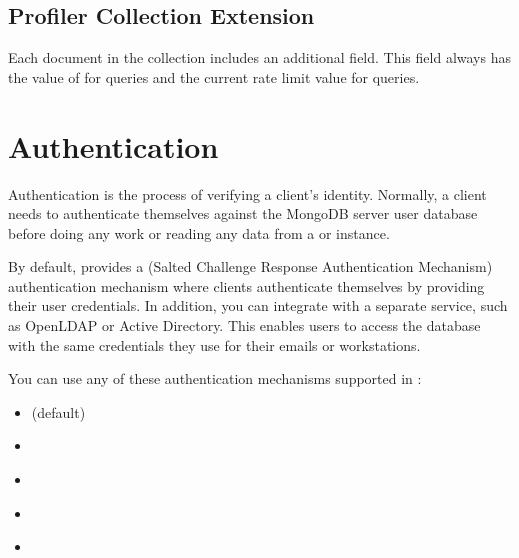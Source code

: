 \documentclass[letterpaper,10pt,english]{sphinxmanual}
\begin{document}
\section{Profiler Collection Extension}
\label{\detokenize{rate-limit:profiler-collection-extension}}
\sphinxAtStartPar
Each document in the  collection
includes an additional  field.
This field always has the value of  for  queries
and the current rate limit value for  queries.


\chapter{Authentication}
\label{\detokenize{authentication:authentication}}\label{\detokenize{authentication:ext-auth}}\label{\detokenize{authentication::doc}}
\sphinxAtStartPar
Authentication is the process of verifying a client’s identity. Normally, a client needs to authenticate themselves
against the MongoDB server user database before doing any work
or reading any data from a  or  instance.

\sphinxAtStartPar
By default,  provides a  (Salted Challenge Response Authentication Mechanism) authentication mechanism where clients authenticate themselves by providing their user credentials.
In addition, you can integrate  with a separate service,
such as OpenLDAP or Active Directory. This enables users to access the database
with the same credentials they use for their emails or workstations.

\sphinxAtStartPar
You can use any of these authentication mechanisms supported in :
\begin{itemize}
\item {} 
\sphinxAtStartPar
{\hyperref[\detokenize{authentication:scram}]{}} (default)

\item {} 
\sphinxAtStartPar
{\hyperref[\detokenize{authentication:x509}]{}}

\item {} 
\sphinxAtStartPar
{\hyperref[\detokenize{authentication:ldap-authentication-sasl}]{}}

\item {} 
\sphinxAtStartPar
{\hyperref[\detokenize{authentication:kerberos-authentication}]{}}

\item {} 
\sphinxAtStartPar
{\hyperref[\detokenize{authorization:native-ldap}]{}}

\end{itemize}
\end{document}
